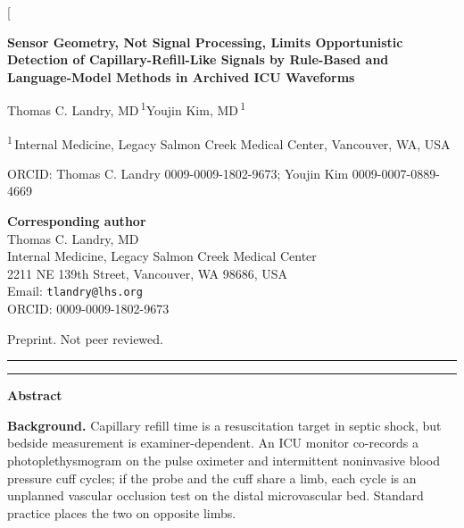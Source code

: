 \documentclass[twocolumn,letterpaper,10pt]{article}
\newcommand{\accenttitlerule}{%
  {\color{accent}\rule{\textwidth}{1.1pt}}\par\vspace{2pt}%
  {\color{accent}\rule{\textwidth}{0.4pt}}\par}
\begin{document}
\twocolumn[%
  \begin{center}
    {\sffamily\bfseries\color{accent}\LARGE
     Sensor Geometry, Not Signal Processing, Limits Opportunistic Detection of Capillary-Refill-Like Signals by Rule-Based and Language-Model Methods in Archived ICU Waveforms\par}
    \vspace{0.9em}
    {\large Thomas C. Landry, MD\,\textsuperscript{1}\quad Youjin Kim, MD\,\textsuperscript{1}\par}
    \vspace{0.5em}
    {\small\textsuperscript{1}\,Internal Medicine, Legacy Salmon Creek Medical Center, Vancouver, WA, USA\par}
    \vspace{0.25em}
    {\small ORCID: Thomas C. Landry 0009-0009-1802-9673; Youjin Kim 0009-0007-0889-4669\par}
    \vspace{0.25em}
    {\small\textbf{Corresponding author}\\
    Thomas C. Landry, MD\\
    Internal Medicine, Legacy Salmon Creek Medical Center\\
    2211 NE 139th Street, Vancouver, WA 98686, USA\\
    Email: \texttt{tlandry@lhs.org}\\
    ORCID: 0009-0009-1802-9673\par}
    \vspace{0.35em}
    {\small Preprint. Not peer reviewed.\par}
  \end{center}
  \vspace{0.4em}
  \accenttitlerule
  \vspace{0.6em}
  {\sffamily\bfseries\large\color{accent}Abstract\par}
  \vspace{0.3em}
  \begingroup\small
  \setlength{\parindent}{0pt}\setlength{\parskip}{0.5em}

  \textbf{Background.} Capillary refill time is a resuscitation target in septic shock,\cite{hernandez2019_andromeda,zampieri2020_bayesian,andromedashock2_2025,jacquetlagreze2023_crt_metaanalysis} but bedside measurement is examiner-dependent. An ICU monitor co-records a photoplethysmogram on the pulse oximeter and intermittent noninvasive blood pressure cuff cycles; if the probe and the cuff share a limb, each cycle is an unplanned vascular occlusion test on the distal microvascular bed. Standard practice places the two on opposite limbs.
\end{document}
